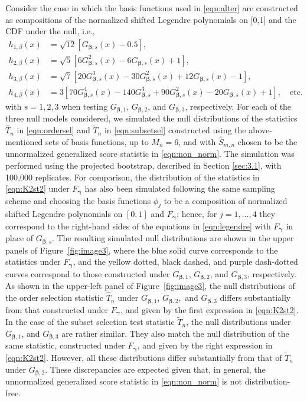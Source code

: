 \documentclass[11pt]{article}
\newcommand{\vect}[1]{\boldsymbol{#1}}
\begin{document}
Consider the case in which the basis functions used in \eqref{eqn:alter} are constructed as compositions of the normalized shifted Legendre polynomials on [0,1] and the CDF under the null, i.e., 
\begin{equation}
\begin{split}
h_{1,\beta}(x)&=\sqrt{12}[G_{\vect{\beta},s}(x)-0.5],\\
h_{2,\beta}(x)&=\sqrt{5}[6G^2_{\vect{\beta},s}(x)-6G_{\vect{\beta},s}(x)+1],\\
h_{3,\beta}(x)&=\sqrt{7}[20G^3_{\vect{\beta},s}(x)-30G^2_{\vect{\beta},s}(x)+12G_{\vect{\beta},s}(x)-1],\\
h_{4,\beta}(x)&=3[70G^4_{\vect{\beta},s}(x)-140G^3_{\vect{\beta},s}  +90G^2_{\vect{\beta},s}(x)-20G_{\vect{\beta},s}(x)+1],\quad\text{etc.}
\label{eqn:legendre}
\end{split}
\end{equation}
with $s=1,2,3$ when testing $G_{\vect{\beta},1}$, $G_{\vect{\beta},2}$, and $G_{\vect{\beta},3}$, respectively. 
For each of the three null models considered,  we simulated the null distributions of the statistics $\widehat{T}_n$ in \eqref{eqn:ordersel} and $\widetilde{T}_n$ in \eqref{eqn:subsetsel} constructed using the above-mentioned sets of basis functions, up to $M_n=6$, and with $\widehat{S}_{m,n}$ chosen to be the unnormalized generalized score statistic in \eqref{eqn:non_norm}. The simulation was performed using the projected bootstrap, described in Section \ref{sec:3.1}, with 100,000 replicates. For comparison, the distribution of the statistics in \eqref{eqn:K2st2} under $F_{\vect{\gamma}}$ has also been simulated following the same sampling scheme and choosing the basis functions $\phi_j$ to be a composition of normalized shifted Legendre polynomials on $[0,1]$ and  $F_{\vect{\gamma}}$; hence, for $j=1,\dots,4$ they correspond to the right-hand sides of the equations in \eqref{eqn:legendre} with $F_{\vect{\gamma}}$ in place of $G_{\vect{\beta},s}$. The resulting simulated null distributions are shown in the upper panels of Figure~\ref{fig:image3}, where the blue solid curve corresponds to the statistics under $F_{\vect{\gamma}}$, and the yellow dotted, black dashed, and purple dash-dotted curves correspond to those constructed under  $G_{\vect{\beta},1}$, $G_{\vect{\beta},2}$, and $G_{\vect{\beta},3}$, respectively.
As shown in the upper-left panel of Figure~\ref{fig:image3}, the null distributions of the order selection statistic $\widehat{T}_n$ under $G_{\vect{\beta},1}$, $G_{\vect{\beta},2},$ and $G_{\vect{\beta},3}$ differs substantially from that constructed under $F_{\vect{\gamma}}$, and given by the first expression in \eqref{eqn:K2st2}. 
In the case of the subset selection test statistic $\widetilde{T}_n$, the null distributions under $G_{\vect{\beta},1}$, and $G_{\vect{\beta},3}$ are rather similar. They also match the null distribution of the same statistic, constructed under $F_{\vect{\gamma}}$, and given by the right expression in \eqref{eqn:K2st2}. However, all these distributions differ substantially from that of $\widetilde{T}_n$ under $G_{\vect{\beta},2}$. These discrepancies are expected given that, in general, the unnormalized generalized score statistic in \eqref{eqn:non_norm} is not distribution-free.
\end{document}

